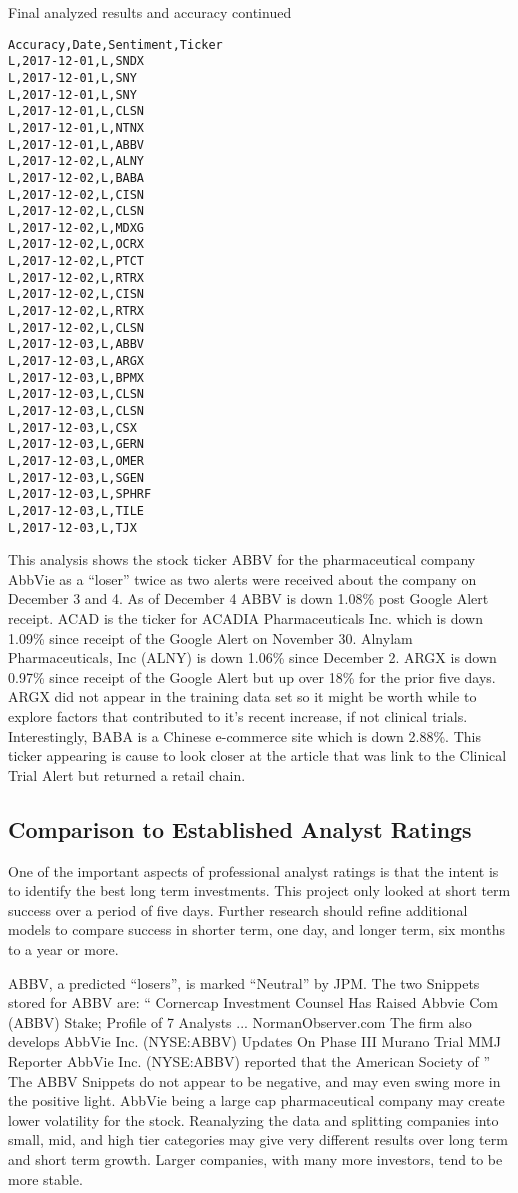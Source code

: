 \documentclass[sigconf]{acmart}
\begin{document}
\begin{table}[htb]
\caption{Final analyzed results and accuracy continued}\label{T:results3}
\begin{verbatim}
Accuracy,Date,Sentiment,Ticker
L,2017-12-01,L,SNDX
L,2017-12-01,L,SNY
L,2017-12-01,L,SNY
L,2017-12-01,L,CLSN
L,2017-12-01,L,NTNX
L,2017-12-01,L,ABBV
L,2017-12-02,L,ALNY
L,2017-12-02,L,BABA
L,2017-12-02,L,CISN
L,2017-12-02,L,CLSN
L,2017-12-02,L,MDXG
L,2017-12-02,L,OCRX
L,2017-12-02,L,PTCT
L,2017-12-02,L,RTRX
L,2017-12-02,L,CISN
L,2017-12-02,L,RTRX
L,2017-12-02,L,CLSN
L,2017-12-03,L,ABBV
L,2017-12-03,L,ARGX
L,2017-12-03,L,BPMX
L,2017-12-03,L,CLSN
L,2017-12-03,L,CLSN
L,2017-12-03,L,CSX
L,2017-12-03,L,GERN
L,2017-12-03,L,OMER
L,2017-12-03,L,SGEN
L,2017-12-03,L,SPHRF
L,2017-12-03,L,TILE
L,2017-12-03,L,TJX
\end{verbatim}
\end{table}
This analysis shows the stock ticker ABBV for the pharmaceutical company AbbVie as a ``loser'' twice as two alerts were received about the company on December 3 and 4. As of December 4 ABBV is down 1.08\% post Google Alert receipt. ACAD is the ticker for ACADIA Pharmaceuticals Inc. which is down 1.09\% since receipt of the Google Alert on November 30. Alnylam Pharmaceuticals, Inc (ALNY) is down 1.06\% since December 2. ARGX is down 0.97\% since receipt of the Google Alert but up over 18\% for the prior five days. ARGX did not appear in the training data set so it might be worth while to explore factors that contributed to it's recent increase, if not clinical trials. Interestingly, BABA is a Chinese e-commerce site which is down 2.88\%. This ticker appearing is cause to look closer at the article that was link to the Clinical Trial Alert but returned a retail chain.

\subsection{Comparison to Established Analyst Ratings}
One of the important aspects of professional analyst ratings is that the intent is to identify the best long term investments. This project only looked at short term success over a period of five days. Further research should refine additional models to compare success in shorter term, one day, and longer term, six months to a year or more.

ABBV, a predicted ``losers'', is marked ``Neutral'' by JPM. The two Snippets stored for ABBV are:
``
Cornercap Investment Counsel Has Raised Abbvie Com (ABBV) Stake; Profile of 7 Analysts ... NormanObserver.com The firm also develops
AbbVie Inc. (NYSE:ABBV) Updates On Phase III Murano Trial MMJ Reporter AbbVie Inc. (NYSE:ABBV) reported that the American Society of
''
The ABBV Snippets do not appear to be negative, and may even swing more in the positive light. AbbVie being a large cap pharmaceutical company may create lower volatility for the stock. Reanalyzing the data and splitting companies into small, mid, and high tier categories may give very different results over long term and short term growth. Larger companies, with many more investors, tend to be more stable.
\end{document}

